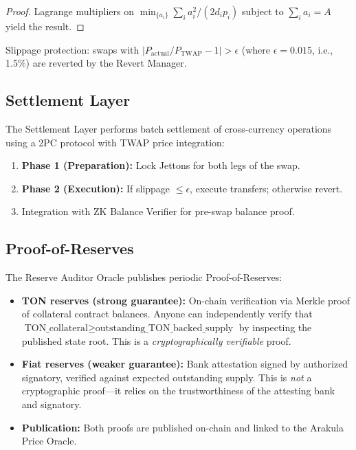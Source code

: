 \documentclass[12pt,a4paper]{article}
\theoremstyle{definition}
\theoremstyle{remark}
\DeclareMathOperator{\TWAP}{TWAP}
\begin{document}
\begin{proof}
Lagrange multipliers on $\min_{\{a_i\}} \sum_{i} a_i^2 / (2 d_i p_i)$ subject to $\sum_i a_i = A$ yield the result.
\end{proof}

Slippage protection: swaps with $|P_{\text{actual}} / P_{\TWAP} - 1| > \epsilon$ (where $\epsilon = 0.015$, i.e., 1.5\%) are reverted by the Revert Manager.

\subsection{Settlement Layer}

The Settlement Layer performs batch settlement of cross-currency operations using a 2PC protocol with TWAP price integration:

\begin{enumerate}[nosep]
    \item \textbf{Phase 1 (Preparation):} Lock Jettons for both legs of the swap.
    \item \textbf{Phase 2 (Execution):} If slippage $\leq \epsilon$, execute transfers; otherwise revert.
    \item Integration with ZK Balance Verifier for pre-swap balance proof.
\end{enumerate}

\subsection{Proof-of-Reserves}

The Reserve Auditor Oracle publishes periodic Proof-of-Reserves:

\begin{itemize}[nosep]
    \item \textbf{TON reserves (strong guarantee):} On-chain verification via Merkle proof of collateral contract balances. Anyone can independently verify that $\text{TON\_collateral} \geq \text{outstanding\_TON\_backed\_supply}$ by inspecting the published state root. This is a \emph{cryptographically verifiable} proof.
    \item \textbf{Fiat reserves (weaker guarantee):} Bank attestation signed by authorized signatory, verified against expected outstanding supply. This is \emph{not} a cryptographic proof---it relies on the trustworthiness of the attesting bank and signatory.
    \item \textbf{Publication:} Both proofs are published on-chain and linked to the Arakula Price Oracle.
\end{itemize}
\end{document}
